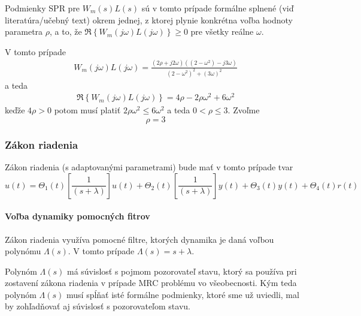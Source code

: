 \documentclass[a4paper, 10pt, ]{article}
\begin{document}
Podmienky SPR pre $W_m(s)L(s)$ sú v tomto prípade formálne splnené (viď literatúra/učebný text) okrem jednej, z ktorej plynie konkrétna voľba hodnoty parametra $\rho$, a to, že $\Re \left\{ W_m(j\omega)L(j\omega) \right\} \geq 0$ pre všetky reálne $\omega$.

V tomto prípade
\begin{align}
    W_m(j\omega)L(j\omega) = \frac{ \left( 2\rho + j2\omega \right) \left( \left( 2 - \omega^2 \right) - j3\omega \right)   }%
                                  { \left( 2 - \omega^2 \right)^2 + \left( 3\omega \right)^2 }
\end{align}
a teda
\begin{align}
    \Re \left\{ W_m(j\omega)L(j\omega) \right\} = 4\rho - 2\rho\omega^2 + 6\omega^2
\end{align}
keďže $4\rho>0$ potom musí platiť $2\rho\omega^2 \leq 6\omega^2$ a teda $0 < \rho \leq 3$.
Zvoľme
\begin{equation}
      \rho = 3
\end{equation}





\subsubsection{Zákon riadenia}

Zákon riadenia (s adaptovanými parametrami) bude mať v tomto prípade tvar
\begin{equation}
	u(t) = \Theta_1(t) \left[ \frac{1}{(s + \lambda)} \right] u(t) + \Theta_2(t) \left[ \frac{1}{(s + \lambda)} \right] y(t) + \Theta_3(t) y(t) + \Theta_4(t) r(t)
\end{equation}




\paragraph{Voľba dynamiky pomocných fitrov}

Zákon riadenia využíva pomocné filtre, ktorých dynamika je daná voľbou polynómu $\Lambda(s)$. V tomto prípade $\Lambda(s) = s + \lambda$.

Polynóm $\Lambda(s)$ má súvislosť s pojmom pozorovateľ stavu, ktorý sa používa pri zostavení zákona riadenia v prípade MRC problému vo všeobecnosti. Kým teda polynóm $\Lambda(s)$ musí spĺňať isté formálne podmienky, ktoré sme už uviedli, mal by zohľadňovať aj súvislosť s pozorovateľom stavu.
\end{document}
